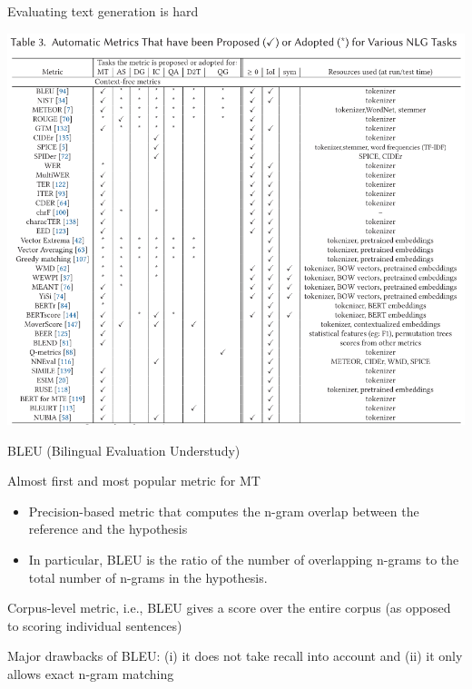 \documentclass[12pt,aspectratio=169,handout]{beamer}
\begin{document}
\begin{frame}{Evaluating text generation is hard}
	
\includegraphics[trim={0 12.2cm 0 0},clip,width=1.2\linewidth]{img/nlg2.png}
	
\end{frame}


\begin{frame}{BLEU (Bilingual Evaluation Understudy)}

Almost first and most popular metric for MT

\begin{itemize}
	\item Precision-based metric that computes the n-gram overlap between the reference and the hypothesis
	\item In particular, BLEU is the ratio of the number of overlapping n-grams to the total number of n-grams in the hypothesis.
\end{itemize}


Corpus-level metric, i.e., BLEU gives a score over the entire corpus (as opposed to scoring individual sentences)

Major drawbacks of BLEU: (i) it does not take recall into account and (ii) it only allows exact n-gram matching


\end{frame}
\end{document}
